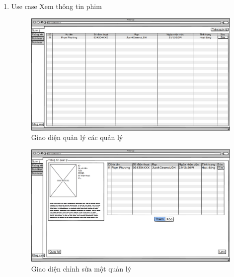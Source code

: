 \documentclass[a4paper, 12pt]{article}
\begin{document}
\begin{enumerate}
        \item Use case Xem thông tin phim
        \begin{figure}[H]
            \begin{center}
                \includegraphics[scale = 0.25]{Wireframe/Admin/Admin_Quản lý.png}
                \caption{Giao diện quản lý các quản lý}
            \end{center}
        \end{figure}
        \begin{figure}[H]
            \begin{center}
                \includegraphics[scale = 0.25]{Wireframe/Admin/Admin_Hình quản lý.png}
                \caption{Giao diện chỉnh sửa một quản lý}
            \end{center}
        \end{figure}


\end{enumerate}
\end{document}
